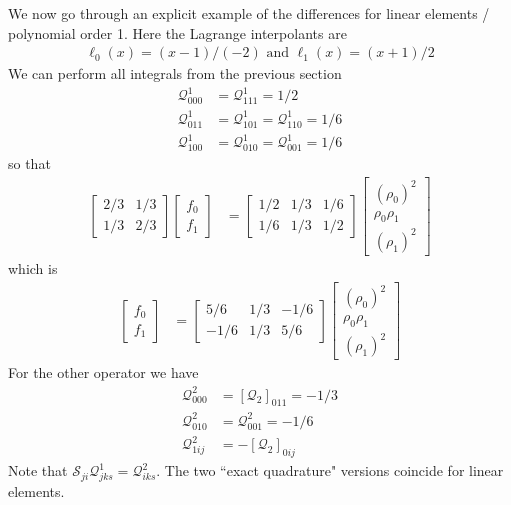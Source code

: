 \documentclass{report}
\numberwithin{equation}{section}
\begin{document}
We now go through an explicit example of the differences for linear elements / polynomial order 1. Here the Lagrange interpolants are
\begin{align}
    \ell_0(x) = (x-1)/ (-2) \text{ and } \ell_1(x) = (x+1) / 2
\end{align}
We can perform all integrals from the previous section
\begin{align}
    \mathcal{Q}^1_{000} &= \mathcal{Q}^1_{111} =  1/2 \\
    \mathcal{Q}^1_{011} &= \mathcal{Q}^1_{101} = \mathcal{Q}^1_{110} = 1/6
    \\
    \mathcal{Q}^1_{100} &=
    \mathcal{Q}^1_{010} =
    \mathcal{Q}^1_{001} = 1/6
\end{align}
so that
\begin{align}
    \begin{bmatrix}
    2/3 & 1/3 \\
    1/3 & 2/3
    \end{bmatrix}
    \begin{bmatrix}
    f_0 \\
    f_1
    \end{bmatrix}
    &= 
        \begin{bmatrix}
    1/2 & 1/3 & 1/6 \\
    1/6 & 1/3 & 1/2
    \end{bmatrix}
        \begin{bmatrix}
    (\rho_0)^2 \\
    \rho_0 \rho_1 \\
    (\rho_1)^2
    \end{bmatrix}
\end{align}
which is 
\begin{align}
        \begin{bmatrix}
    f_0 \\
    f_1
    \end{bmatrix}
    &= 
        \begin{bmatrix}
    5/6 & 1/3 & -1/6 \\
    -1/6 & 1/3 & 5/6
    \end{bmatrix}
        \begin{bmatrix}
    (\rho_0)^2 \\
    \rho_0 \rho_1 \\
    (\rho_1)^2
    \end{bmatrix}
\end{align}
For the other operator we have
\begin{align}
    \mathcal{Q}^2_{000} &= [\mathcal{Q}_2]_{011} = -1/3 
    \\
    \mathcal{Q}^2_{010} &= \mathcal{Q}^2_{001} = -1/6 
    \\
    \mathcal{Q}^2_{1ij} &= -[\mathcal{Q}_2]_{0ij}  
\end{align}
Note that $\mathcal{S}_{ji}\mathcal{Q}^1_{jks} = \mathcal{Q}^2_{iks}$. The two ``exact quadrature" versions coincide for linear elements.
\end{document}
